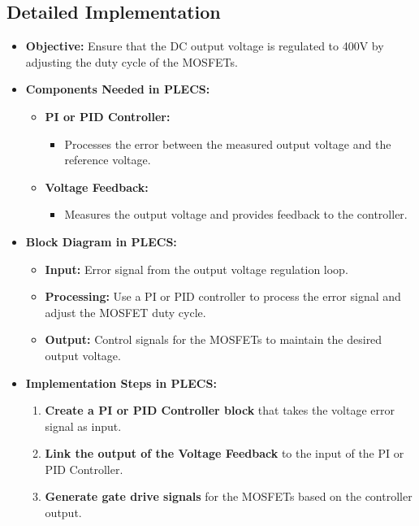\documentclass{article}
\begin{document}
\subsection{Detailed Implementation}
\begin{itemize}
    \item \textbf{Objective:} Ensure that the DC output voltage is regulated to 400V by adjusting the duty cycle of the MOSFETs.
    \item \textbf{Components Needed in PLECS:}
    \begin{itemize}
        \item \textbf{PI or PID Controller:}
        \begin{itemize}
            \item Processes the error between the measured output voltage and the reference voltage.
        \end{itemize}
        \item \textbf{Voltage Feedback:}
        \begin{itemize}
            \item Measures the output voltage and provides feedback to the controller.
        \end{itemize}
    \end{itemize}
    \item \textbf{Block Diagram in PLECS:}
    \begin{itemize}
        \item \textbf{Input:} Error signal from the output voltage regulation loop.
        \item \textbf{Processing:} Use a PI or PID controller to process the error signal and adjust the MOSFET duty cycle.
        \item \textbf{Output:} Control signals for the MOSFETs to maintain the desired output voltage.
    \end{itemize}
    \item \textbf{Implementation Steps in PLECS:}
    \begin{enumerate}
        \item \textbf{Create a PI or PID Controller block} that takes the voltage error signal as input.
        \item \textbf{Link the output of the Voltage Feedback} to the input of the PI or PID Controller.
        \item \textbf{Generate gate drive signals} for the MOSFETs based on the controller output.
    \end{enumerate}
\end{itemize}
\end{document}
